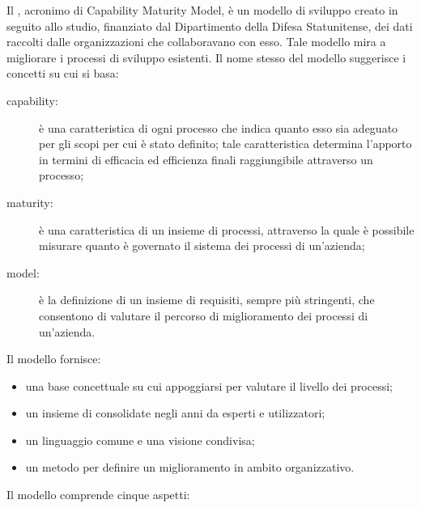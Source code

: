  \label{app:CMM}
	Il , acronimo di Capability Maturity Model, è un modello di sviluppo creato in seguito allo studio, finanziato dal  Dipartimento della Difesa Statunitense, dei dati raccolti dalle organizzazioni che collaboravano con esso. Tale modello mira a migliorare i processi di sviluppo  esistenti.
	Il nome stesso del modello suggerisce i concetti su cui si basa:
	\begin{description}
		\item[capability:] è una caratteristica di ogni processo che indica quanto esso sia adeguato per gli scopi per cui è stato definito; tale caratteristica determina l'apporto in termini di efficacia ed efficienza finali raggiungibile attraverso un processo;
		\item[maturity:] è una caratteristica di un insieme di processi, attraverso la quale è possibile misurare quanto è governato il sistema dei processi di un'azienda;
		\item[model:] è la definizione di un insieme di requisiti, sempre più stringenti, che consentono di valutare il percorso di miglioramento dei processi di un'azienda.
	\end{description}
	Il modello  fornisce:
	\begin{itemize} 
		\item una base concettuale su cui appoggiarsi per valutare il livello dei processi;
		\item un insieme di \textit{} consolidate negli anni da esperti e utilizzatori;
		\item un linguaggio comune e una visione condivisa;
		\item un metodo per definire un miglioramento in ambito organizzativo.
	\end{itemize}
		Il modello  comprende cinque aspetti:
